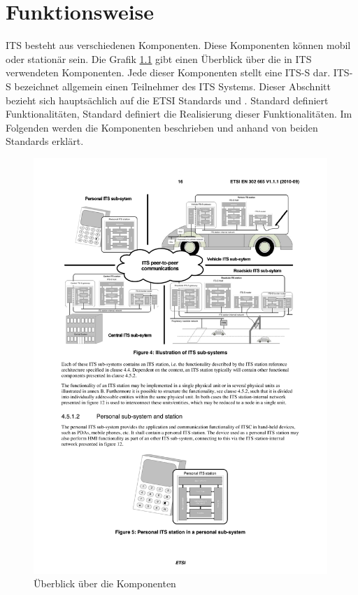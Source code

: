 \chapter{Funktionsweise \label{chap_funktionsweise}}
\ac{ITS} besteht aus verschiedenen Komponenten. Diese Komponenten können mobil oder stationär sein. Die Grafik \ref{fig:funktionsweise_komponentenueberblick} gibt einen Überblick über die in \ac{ITS} verwendeten Komponenten. Jede dieser Komponenten stellt eine \ac{ITS-S} dar. \ac{ITS-S} bezeichnet allgemein einen Teilnehmer des \ac{ITS} Systems. Dieser Abschnitt bezieht sich hauptsächlich auf die \ac{ETSI} Standards \cite{en302665} und \cite{etsi302636-3}. Standard \cite{en302665} definiert Funktionalitäten, Standard  \cite{etsi302636-3} definiert die Realisierung dieser Funktionalitäten. Im Folgenden werden die Komponenten beschrieben und anhand von beiden Standards erklärt.


\begin{figure}
	\includegraphics[width=0.99\textwidth]{content/images/01_funktionsweise/ueberblick-ITS-subsystems.pdf}
	\caption{Überblick über die Komponenten \cite{en302665}}
	\label{fig:funktionsweise_komponentenueberblick}
\end{figure}


